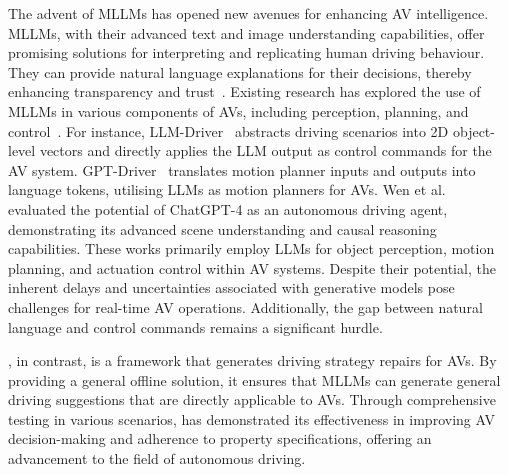 The advent of MLLMs has opened new avenues for enhancing AV intelligence. MLLMs, with their advanced text and image understanding capabilities, offer promising solutions for interpreting and replicating human driving behaviour. They can provide natural language explanations for their decisions, thereby enhancing transparency and trust~\cite{cui2024survey}. Existing research has explored the use of MLLMs in various components of AVs, including perception, planning, and control~\cite{chen2023driving, mao2023gpt, wen2024road}. For instance, LLM-Driver~\cite{chen2023driving} abstracts driving scenarios into 2D object-level vectors and directly applies the LLM output as control commands for the AV system. GPT-Driver~\cite{mao2023gpt} translates motion planner inputs and outputs into language tokens, utilising LLMs as motion planners for AVs. Wen et al.~\cite{wen2024road} evaluated the potential of ChatGPT-4 as an autonomous driving agent, demonstrating its advanced scene understanding and causal reasoning capabilities. 
These works primarily employ LLMs for object perception, motion planning, and actuation control within AV systems. Despite their potential, the inherent delays and uncertainties associated with generative models pose challenges for real-time AV operations. Additionally, the gap between natural language and control commands remains a significant hurdle.


\coolname, in contrast, is a framework that generates driving strategy repairs for AVs. By providing a general offline solution, it ensures that MLLMs can generate general driving suggestions that are directly applicable to AVs. Through comprehensive testing in various scenarios, \coolname has demonstrated its effectiveness in improving AV decision-making and adherence to property specifications, offering an advancement to the field of autonomous driving.